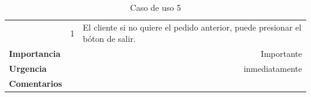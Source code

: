 \documentclass[conference]{IEEEtran}
\begin{document}
\begin{table}[H]
\begin{adjustbox}{width=0.44\textwidth}
\begin{tabular}{|p{11.215em}|r|r|}
\cmidrule{2-3}    \multicolumn{1}{|c|}{} & \multicolumn{1}{c|}{\multirow{2}[2]{*}{1}} & \multicolumn{1}{l|}{\multirow{2}[2]{*}{El cliente si no quiere el pedido anterior, puede presionar el bóton de salir.}} \\
    \multicolumn{1}{|c|}{} &       &  \\
    \midrule
    \textbf{Importancia} & \multicolumn{2}{p{37.355em}|}{Importante} \\
    \midrule
    \textbf{Urgencia} & \multicolumn{2}{p{37.355em}|}{inmediatamente} \\
    \midrule
    \textbf{Comentarios} & \multicolumn{2}{r|}{} \\
    \bottomrule
    \end{tabular}%
    \end{adjustbox}
    \vspace{0.2cm}
    \caption{Caso de uso 5}
  \label{tab:addlabel}%
\end{table}%
\end{document}
